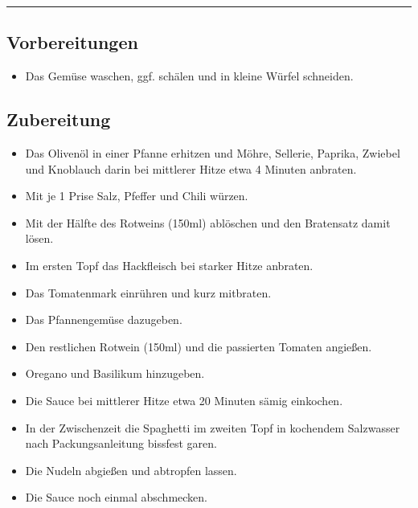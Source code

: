 \rule{\textwidth}{0.4pt}


\subsection*{Vorbereitungen}

\begin{itemize}
    \item Das Gemüse waschen, ggf. schälen und in kleine Würfel schneiden.
\end{itemize}



\bigbreak
\subsection*{Zubereitung}

    \begin{itemize}
        \item Das Olivenöl in einer Pfanne erhitzen und Möhre, Sellerie, Paprika, Zwiebel und Knoblauch darin bei mittlerer Hitze etwa 4 Minuten anbraten.
        \item Mit je 1 Prise Salz, Pfeffer und Chili würzen.
        \item Mit der Hälfte des Rotweins (150ml) ablöschen und den Bratensatz damit lösen.
    \end{itemize}

    \bigbreak

    \begin{itemize}   
        \item Im ersten Topf das Hackfleisch bei starker Hitze anbraten.
        \item Das Tomatenmark einrühren und kurz mitbraten.
        \item Das Pfannengemüse dazugeben.
        \item Den restlichen Rotwein (150ml) und die passierten Tomaten angießen.
        \item Oregano und Basilikum hinzugeben.
        \item Die Sauce bei mittlerer Hitze etwa 20 Minuten sämig einkochen.
    \end{itemize}

    \bigbreak

    \begin{itemize}
        \item In der Zwischenzeit die Spaghetti im zweiten Topf in kochendem Salzwasser nach Packungsanleitung bissfest garen.
        \item Die Nudeln abgießen und abtropfen lassen.
        \item Die Sauce noch einmal abschmecken.
    \end{itemize}

